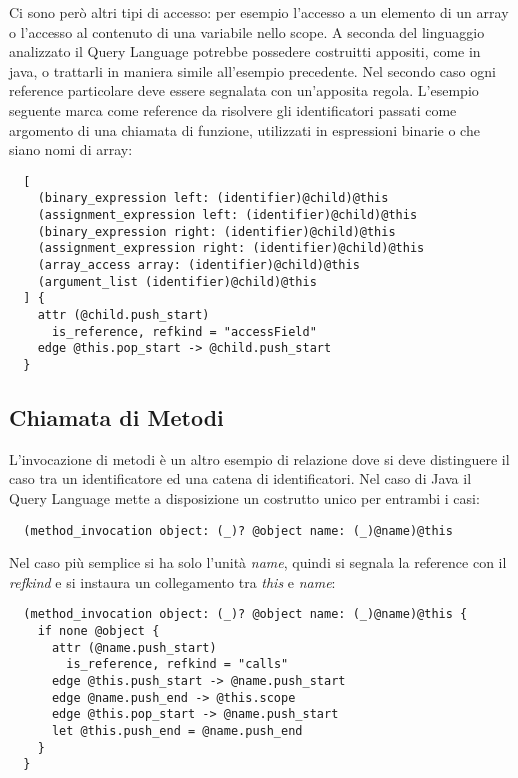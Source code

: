 Ci sono per\`o altri tipi di accesso: per esempio l'accesso a un elemento di un array o l'accesso al contenuto di una variabile nello scope. A seconda del linguaggio analizzato il Query Language potrebbe possedere costruitti appositi, come in java, o trattarli in maniera simile all'esempio precedente.
Nel secondo caso ogni reference particolare deve essere segnalata con un'apposita regola.
L'esempio seguente marca come reference da risolvere gli identificatori passati come argomento di una chiamata di funzione, utilizzati in espressioni binarie o che siano nomi di array:

\begin{lstlisting}
  [
    (binary_expression left: (identifier)@child)@this
    (assignment_expression left: (identifier)@child)@this
    (binary_expression right: (identifier)@child)@this
    (assignment_expression right: (identifier)@child)@this
    (array_access array: (identifier)@child)@this
    (argument_list (identifier)@child)@this
  ] {
    attr (@child.push_start)
      is_reference, refkind = "accessField"
    edge @this.pop_start -> @child.push_start
  }
\end{lstlisting}

\subsection{Chiamata di Metodi}

L'invocazione di metodi \`e un altro esempio di relazione dove si deve distinguere il caso tra un identificatore ed una catena di identificatori. Nel caso di Java il Query Language mette a disposizione un costrutto unico per entrambi i casi:

\begin{lstlisting}
  (method_invocation object: (_)? @object name: (_)@name)@this
\end{lstlisting}

Nel caso pi\`u semplice si ha solo l'unit\`a \emph{name}, quindi si segnala la reference con il \emph{refkind} e si instaura un collegamento tra \emph{this} e \emph{name}:

\begin{lstlisting}
  (method_invocation object: (_)? @object name: (_)@name)@this {
    if none @object {
      attr (@name.push_start)
        is_reference, refkind = "calls"
      edge @this.push_start -> @name.push_start
      edge @name.push_end -> @this.scope
      edge @this.pop_start -> @name.push_start
      let @this.push_end = @name.push_end
    }
  }
\end{lstlisting}

